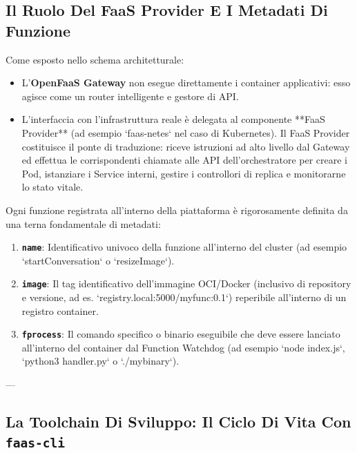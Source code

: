 \documentclass[11pt, a4paper]{article}
\begin{document}

\subsection{Il Ruolo Del FaaS Provider E I Metadati Di Funzione}

Come esposto nello schema architetturale:
\begin{itemize}
    \item L'\textbf{OpenFaaS Gateway} non esegue direttamente i container applicativi: esso agisce come un router intelligente e gestore di API.
    \item L'interfaccia con l'infrastruttura reale è delegata al componente **FaaS Provider** (ad esempio `faas-netes` nel caso di Kubernetes). Il FaaS Provider costituisce il ponte di traduzione: riceve istruzioni ad alto livello dal Gateway ed effettua le corrispondenti chiamate alle API dell'orchestratore per creare i Pod, istanziare i Service interni, gestire i controllori di replica e monitorarne lo stato vitale.
\end{itemize}

Ogni funzione registrata all'interno della piattaforma è rigorosamente definita da una terna fondamentale di metadati:
\begin{enumerate}[noitemsep]
    \item \textbf{\texttt{name}}: Identificativo univoco della funzione all'interno del cluster (ad esempio `startConversation` o `resizeImage`).
    \item \textbf{\texttt{image}}: Il tag identificativo dell'immagine OCI/Docker (inclusivo di repository e versione, ad es. `registry.local:5000/myfunc:0.1`) reperibile all'interno di un registro container.
    \item \textbf{\texttt{fprocess}}: Il comando specifico o binario eseguibile che deve essere lanciato all'interno del container dal Function Watchdog (ad esempio `node index.js`, `python3 handler.py` o `./mybinary`).
\end{enumerate}

---

\subsection{La Toolchain Di Sviluppo: Il Ciclo Di Vita Con \texttt{faas-cli}}
\end{document}
